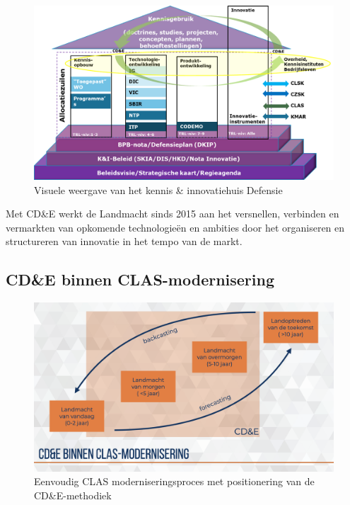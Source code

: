 \documentclass[
]{book}
\begin{document}
\begin{figure}

{\centering \includegraphics[width=0.7\linewidth]{data/images/BO-2016-Defensie-KI-huis} 

}

\caption{Visuele weergave van het kennis \& innovatiehuis Defensie}\label{fig:ki-test}
\end{figure}

Met CD\&E werkt de Landmacht sinds 2015 aan het versnellen, verbinden en vermarkten van opkomende technologieën en ambities door het organiseren en structureren van innovatie in het tempo van de markt.

\hypertarget{cde-binnen-clas-modernisering}{%
\subsection*{CD\&E binnen CLAS-modernisering}\label{cde-binnen-clas-modernisering}}

\begin{figure}

{\centering \includegraphics[width=0.7\linewidth]{data/keynote-slides/20200430-CDE-Designprocess/20200430-CDE-Designprocess.008} 

}

\caption{Eenvoudig CLAS moderniseringsproces met positionering van de CD\&E-methodiek}\label{fig:simpel-proces}
\end{figure}
\end{document}

